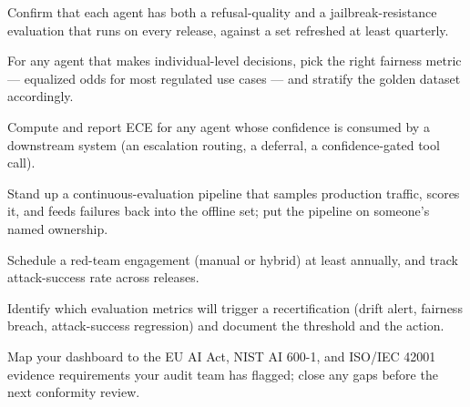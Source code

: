 \begin{TNchecklist}
\item Confirm that each agent has both a refusal-quality and a jailbreak-resistance evaluation that runs on every release, against a set refreshed at least quarterly.
\item For any agent that makes individual-level decisions, pick the right fairness metric --- equalized odds for most regulated use cases --- and stratify the golden dataset accordingly.
\item Compute and report ECE for any agent whose confidence is consumed by a downstream system (an escalation routing, a deferral, a confidence-gated tool call).
\item Stand up a continuous-evaluation pipeline that samples production traffic, scores it, and feeds failures back into the offline set; put the pipeline on someone's named ownership.
\item Schedule a red-team engagement (manual or hybrid) at least annually, and track attack-success rate across releases.
\item Identify which evaluation metrics will trigger a recertification (drift alert, fairness breach, attack-success regression) and document the threshold and the action.
\item Map your dashboard to the EU AI Act, NIST AI 600-1, and ISO/IEC 42001 evidence requirements your audit team has flagged; close any gaps before the next conformity review.
\end{TNchecklist}



